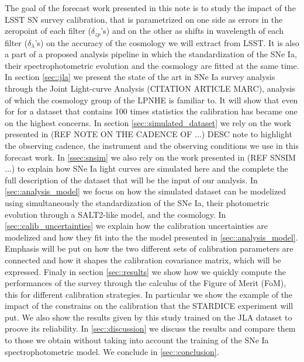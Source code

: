 \documentclass[\docopts]{\docclass}
\begin{document}
The goal of the forecast work presented in this note is to study the impact of the LSST SN survey calibration, that is parametrized on one side as errors in the zeropoint of each filter ($\delta_{zp}$'s) and on the other as shifts in wavelength of each filter ($\delta_\lambda$'s) on the accuracy of the cosmology we will extract from LSST.
It is also a part of a proposed analysis pipeline in which the standardization of the SNe Ia, their spectrophotometric evolution and the cosmology are fitted at the same time.
In section \ref{sec::jla} we present the state of the art in SNe Ia survey analysis through the Joint Light-curve Analysis (CITATION ARTICLE MARC), analysis of which the cosmology group of the LPNHE is familiar to.
It will show that even for for a dataset that contains 100 times statistics the calibration has became one on the highest concerns.
In section \ref{sec::simulated_dataset} we rely on the work presented in (REF NOTE ON THE CADENCE OF ...) DESC note to highlight the observing cadence, the instrument and the observing conditions we use in this forecast work.
In \ref{ssec:snsim} we also rely on the work presented in (REF SNSIM ...) to explain how SNe Ia light curves are simulated here and the complete the full description of the dataset that will be the input of our analysis.
In \ref{sec::analysis_model} we focus on how the simulated dataset can be modelized using simultaneously the standardization of the SNe Ia, their photometric evolution through a SALT2-like model, and the cosmology.
In \ref{sec::calib_uncertainties} we explain how the calibration uncertainties are modelized and how they fit into the the model presented in \ref{sec::analysis_model}.
Emphasis will be put on how the two different sets of calibration parameters are connected and how it shapes the calibration covariance matrix, which will be expressed.
Finaly in section \ref{sec::results} we show how we quickly compute the performances of the survey through the calculus of the Figure of Merit (FoM), this for different calibration strategies.
In particular we show the example of the impact of the constrains on the calibration that the STARDICE experiment will put.
We also show the results given by this study trained on the JLA dataset to proove its reliability.
In \ref{sec::discussion} we discuss the results and compare them to those we obtain without taking into account the training of the SNe Ia spectrophotometric model.
We conclude in \ref{sec::conclusion}.
\end{document}
